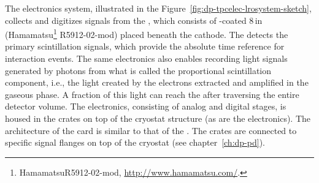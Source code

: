 The  electronics system, illustrated in the Figure~\ref{fig:dp-tpcelec-lrosystem-sketch},  collects and digitizes signals from the , which consists of -coated \num{8}\,in  (Hamamatsu\footnote{Hamamatsu\texttrademark R5912-02-mod, \url{http://www.hamamatsu.com/}.} R5912-02-mod) placed beneath the  cathode. The %
 detects the primary scintillation signals, which provide the absolute time reference for interaction events. The same electronics also enables recording light signals generated by photons from what is called the proportional scintillation component, i.e., the light created by the electrons extracted and amplified in the gaseous phase. A fraction of this light can reach the  after traversing the entire detector volume. The  electronics, consisting of analog and digital stages, is housed in the  crates on top of the cryostat structure (as are the  electronics). %
The architecture of the   card is similar to that of the   . The   crates are connected to specific  signal \fdth flanges on top of the cryostat (see chapter~\ref{ch:dp-pd}).

